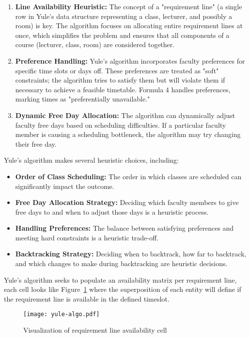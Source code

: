\begin{enumerate}[label=\alph*.]
    \item \textbf{Line Availability Heuristic:} The concept of a "requirement line" (a single row in Yule's data structure representing a class, lecturer, and possibly a room) is key.
	The algorithm focuses on allocating entire requirement lines at once, which simplifies the problem and ensures that all components of a course (lecturer, class, room) are considered together.

    \item \textbf{Preference Handling:} Yule's algorithm incorporates faculty preferences for specific time slots or days off.
	These preferences are treated as "soft" constraints; the algorithm tries to satisfy them but will violate them if necessary to achieve a feasible timetable.
	Formula 4 handles preferences, marking times as "preferentially unavailable."

    \item \textbf{Dynamic Free Day Allocation:} The algorithm can dynamically adjust faculty free days based on scheduling difficulties.
	If a particular faculty member is causing a scheduling bottleneck, the algorithm may try changing their free day.
\end{enumerate}

Yule's algorithm makes several heuristic choices, including:

\begin{itemize}
    \item \textbf{Order of Class Scheduling:} The order in which classes are scheduled can significantly impact the outcome.
    \item \textbf{Free Day Allocation Strategy:} Deciding which faculty members to give free days to and when to adjust those days is a heuristic process.
    \item \textbf{Handling Preferences:} The balance between satisfying preferences and meeting hard constraints is a heuristic trade-off.
    \item \textbf{Backtracking Strategy:} Deciding when to backtrack, how far to backtrack, and which changes to make during backtracking are heuristic decisions.
\end{itemize}

Yule's algorithm seeks to populate an availability matrix per requirement line, each cell looks like Figure~\ref{fig:yuleAlgorithm} where the superposition of each entity will define if the requirement line is available in the defined timeslot.
\begin{figure}
    \centering
    \caption{Visualization of requirement line availability cell}
    \texttt{[image: yule-algo.pdf]}
    \label{fig:yuleAlgorithm}
\end{figure}

